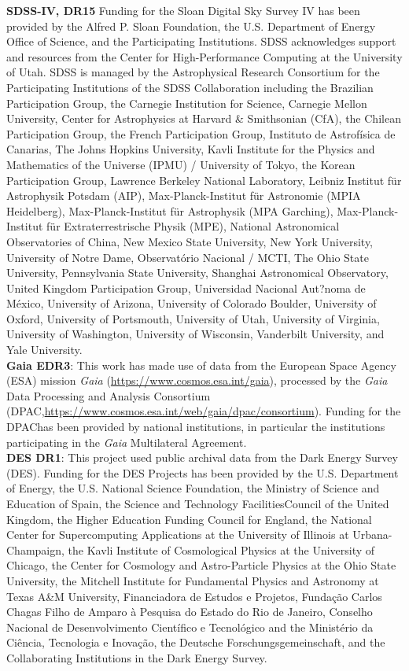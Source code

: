 \documentclass[fleqn,usenatbib]{mnras}
\begin{document}
{\bf SDSS-IV, DR15} Funding for the Sloan Digital Sky Survey IV has been provided by the Alfred P. Sloan Foundation, the U.S. Department of Energy Office of Science, and the Participating Institutions. SDSS acknowledges support and resources from the Center for High-Performance Computing at the University of Utah. SDSS is managed by the Astrophysical Research Consortium for the Participating Institutions of the SDSS Collaboration including the Brazilian Participation Group, the Carnegie Institution for Science, Carnegie Mellon University, Center for Astrophysics at Harvard \& Smithsonian (CfA), the Chilean Participation Group, the French Participation Group, Instituto de Astrof{\'i}sica de Canarias, The Johns Hopkins University, Kavli Institute for the Physics and Mathematics of the Universe (IPMU) / University of Tokyo, the Korean Participation Group, Lawrence Berkeley National Laboratory, Leibniz Institut f{\"u}r Astrophysik Potsdam (AIP), Max-Planck-Institut f{\"u}r Astronomie (MPIA Heidelberg), Max-Planck-Institut f{\"u}r Astrophysik (MPA Garching), Max-Planck-Institut f{\"u}r Extraterrestrische Physik (MPE), National Astronomical Observatories of China, New Mexico State University, New York University, University of Notre Dame, Observat{\'o}rio Nacional / MCTI, The Ohio State University, Pennsylvania State University, Shanghai Astronomical Observatory, United Kingdom Participation Group, Universidad Nacional Aut?noma de M{\'e}xico, University of Arizona, University of Colorado Boulder, University of Oxford, University of Portsmouth, University of Utah, University of Virginia, University of Washington, University of Wisconsin, Vanderbilt University, and Yale University. \\
{\bf Gaia EDR3}: This work has made use of data from the European Space Agency (ESA) mission {\it Gaia} (\url{https://www.cosmos.esa.int/gaia}), processed by the {\it Gaia} Data Processing and Analysis Consortium (DPAC,\url{https://www.cosmos.esa.int/web/gaia/dpac/consortium}). Funding for the DPAChas been provided by national institutions, in particular the institutions participating in the {\it Gaia} Multilateral Agreement.\\
{\bf DES DR1}: This project used public archival data from the Dark Energy Survey (DES). Funding for the DES Projects has been provided by the U.S. Department of Energy, the U.S. National Science Foundation, the Ministry of Science and Education of Spain, the Science and Technology FacilitiesCouncil of the United Kingdom, the Higher Education Funding Council for England, the National Center for Supercomputing Applications at the University of Illinois at Urbana-Champaign, the Kavli Institute of Cosmological Physics at the University of Chicago, the Center for Cosmology and Astro-Particle Physics at the Ohio State University, the Mitchell Institute for Fundamental Physics and Astronomy at Texas A\&M University, Financiadora de Estudos e Projetos, Funda{\c c}{\~a}o Carlos Chagas Filho de Amparo {\`a} Pesquisa do Estado do Rio de Janeiro, Conselho Nacional de Desenvolvimento Cient{\'i}fico e Tecnol{\'o}gico and the Minist{\'e}rio da Ci{\^e}ncia, Tecnologia e Inova{\c c}{\~a}o, the Deutsche Forschungsgemeinschaft, and the Collaborating Institutions in the Dark Energy Survey.
\end{document}
